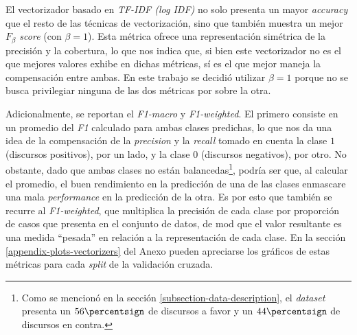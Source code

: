 El vectorizador basado en \textit{TF-IDF (log IDF)} no solo presenta un mayor
\textit{accuracy} que el resto de las técnicas de vectorización, sino que
también muestra un mejor \textit{$F_{\beta}$ score} (con $\beta=1$).
Esta métrica ofrece una representación simétrica de la precisión y la cobertura,
lo que nos indica que, si bien este vectorizador no es el que mejores valores
exhibe en dichas métricas, sí es el que mejor maneja la compensación
entre ambas. En este trabajo se decidió utilizar $\beta=1$ porque no se busca
privilegiar ninguna de las dos métricas por sobre la otra.
\par
Adicionalmente, se reportan el \textit{F1-macro} y \textit{F1-weighted}.
El primero consiste en un promedio del \textit{F1} calculado para ambas clases
predichas, lo que nos da una idea de la compensación de la \textit{precision} y la
\textit{recall} tomado en cuenta la clase $1$ (discursos positivos), por un lado, y
la clase $0$ (discursos negativos), por otro. No obstante, dado que ambas clases no
están balancedas\footnote{Como se mencionó en la sección
\ref{subsection-data-description}, el \textit{dataset} presenta un $56\percentsign$
de discursos a favor y un $44\percentsign$ de discursos en contra.}, podría ser que,
al calcular el promedio, el buen rendimiento en la predicción de una de las clases
enmascare una mala \textit{performance} en la predicción de la otra. Es por esto
que también se recurre al \textit{F1-weighted}, que multiplica la precisión de cada
clase por proporción de casos que presenta en el conjunto de datos,
de mod que el valor resultante es una medida ``pesada'' en relación a la representación
de cada clase. En la sección \ref{appendix-plots-vectorizers} del Anexo pueden
apreciarse los gráficos de estas métricas para cada \textit{split} de la validación
cruzada.
